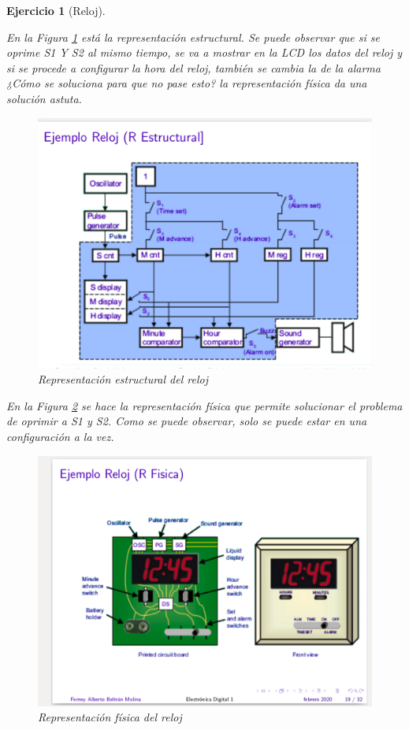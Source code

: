 \documentclass[12pt,letterpaper]{book}
\newtheorem{exercise}{Ejercicio}
\begin{document}
\begin{exercise}[Reloj]
\begin{multicols}{2}
En la Figura \ref{repEst1} está la representación estructural. Se puede observar que si se oprime S1 Y S2 al mismo tiempo, se va a mostrar en la LCD los datos del reloj y si se procede a configurar la hora del reloj, también se cambia la de la alarma ¿Cómo se soluciona para que no pase esto? la representación física da una solución astuta. 

\begin{figure}[H]
\centering
\includegraphics[width=1\linewidth]{figures/repEst1.png}
\caption{Representación estructural del reloj}
\label{repEst1}
\end{figure}
\vspace{0.2cm}

En la Figura \ref{repFis1} se hace la representación física que permite solucionar el problema de oprimir a S1 y S2. Como se puede observar, solo se puede estar en una configuración a la vez. 

\begin{figure}[H]
\centering
\includegraphics[width=1\linewidth]{figures/repFis1.png}
\caption{Representación física del reloj}
\label{repFis1}
\end{figure}
\vspace{0.2cm}
\end{multicols}
\end{exercise}
\end{document}
